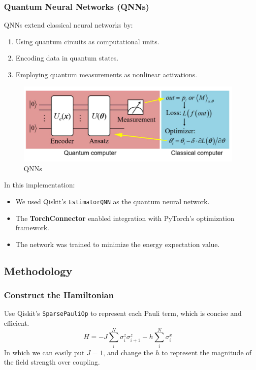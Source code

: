 \documentclass[a4paper]{article}
\begin{document}
\subsubsection{Quantum Neural Networks (QNNs)}
QNNs extend classical neural networks by:
\begin{enumerate}
    \item Using quantum circuits as computational units.
    \item Encoding data in quantum states.
    \item Employing quantum measurements as nonlinear activations.
\end{enumerate}

\begin{figure}[htbp]
    \centering
    \includegraphics[width=0.5\linewidth]{images/QNN.png}
    \caption{QNNs}
    \label{3}
\end{figure}

In this implementation:
\begin{itemize}
    \item We used Qiskit's \verb|EstimatorQNN| as the quantum neural network.
    \item The \textbf{TorchConnector} enabled integration with PyTorch's optimization framework.
    \item The network was trained to minimize the energy expectation value.
\end{itemize}

\subsection{Methodology}
\subsubsection{Construct the Hamiltonian}
Use Qiskit's \verb|SparsePauliOp| to represent each Pauli term, which is concise and efficient.
    \begin{equation}
         H=-J\sum_i^N\sigma_i^{z}\sigma_{i+1}^{z}-h\sum_i^N\sigma_i^x
    \end{equation}
In which we can easily put $J=1$, and change the $h$ to represent the magnitude of the field strength over coupling.
\end{document}
